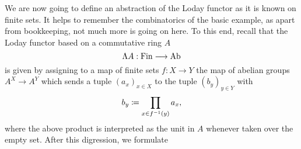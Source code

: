   We are now going to define an abstraction of the Loday functor as it is known on finite sets. It helps to remember the combinatorics of the basic example, as apart from bookkeeping, not much more is going on here. To this end, recall that the Loday functor based on a commutative ring $A$
  \begin{displaymath}
    \Lambda A: \mathrm{Fin} \longrightarrow \mathrm{Ab}
  \end{displaymath}
  is given by assigning to a map of finite sets $f: X \to Y$ the map of abelian groups $A^X \to A^Y$ which sends a tuple $(a_x)_{x \in X}$ to the tuple $(b_y)_{y \in Y}$ with 
  \begin{displaymath}
    b_y \coloneqq \prod_{x \in f^{-1}(y)} a_x,
  \end{displaymath}
  where the above product is interpreted as the unit in $A$ whenever taken over the empty set. After this digression, we formulate
  
